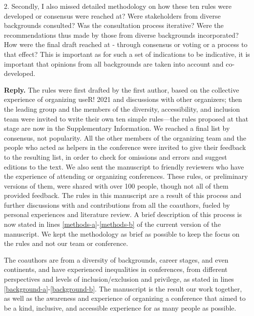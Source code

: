\documentclass{article}
\newenvironment{Reply}{\noindent\color{BlueViolet}\textbf{Reply.}}{\vspace{1em}}
\begin{document}
2. Secondly, I also missed detailed methodology on how these ten rules were developed or consensus were reached at? Were stakeholders from diverse backgrounds consulted? Was the consultation process iterative? Were the recommendations thus made by those from diverse backgrounds incorporated? How were the final draft reached at - through consensus or voting or a process to that effect? This is important as for such a set of indications to be indicative, it is important that opinions from all backgrounds are taken into account and co-developed.

\begin{Reply}
    The rules were first drafted by the first author, based on the collective experience of organizing useR! 2021 and discussions with other organizers; then the leading group and the members of the diversity, accessibility, and inclusion team were invited to write their own ten simple rules—the rules proposed at that stage are now in the Supplementary Information.
    We reached a final list by consensus, not popularity. All the other members of the organizing team and the people who acted as helpers in the conference were invited to give their feedback to the resulting list, in order to check for omissions and errors and suggest editions to the text.
    We also sent the manuscript to friendly reviewers who have the experience of attending or organizing conferences. 
    These rules, or preliminary versions of them, were shared with over 100 people, though not all of them provided feedback.
    The rules in this manuscript are a result of this process and further discussions with and contributions from all the coauthors, fueled by personal experiences and literature review.
    A brief description of this process is now stated in lines \ref{methods-a}-\ref{methods-b} of the current version of the manuscript.
    We kept the methodology as brief as possible to keep the focus on the rules and not our team or conference. 
    
    The coauthors are from a diversity of backgrounds, career stages, and even continents, and have experienced inequalities in conferences, from different perspectives and levels of inclusion/exclusion and privilege, as stated in lines \ref{background-a}-\ref{background-b}.
    The manuscript is the result our work together, as well as the awareness and experience of organizing a conference that aimed to be a kind, inclusive, and accessible experience for as many people as possible. 
\end{Reply}
\end{document}

